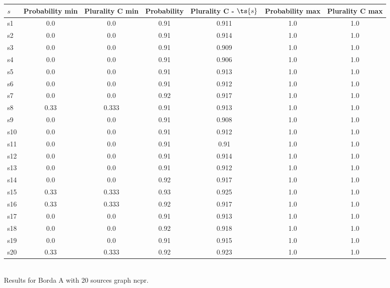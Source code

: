 \documentclass{article}
\begin{document}
\noindent\begin{tabular}{|l|c|c|c|c|c|c|}
\hline
$s$& Probability min & Plurality C min & Probability & Plurality C - $\ts{s}$ & Probability max & Plurality C max\\
\hline
s1 &0.0 & 0.0 & 0.91 & 0.911 & 1.0 & 1.0\\
\hline
s2 &0.0 & 0.0 & 0.91 & 0.914 & 1.0 & 1.0\\
\hline
s3 &0.0 & 0.0 & 0.91 & 0.909 & 1.0 & 1.0\\
\hline
s4 &0.0 & 0.0 & 0.91 & 0.906 & 1.0 & 1.0\\
\hline
s5 &0.0 & 0.0 & 0.91 & 0.913 & 1.0 & 1.0\\
\hline
s6 &0.0 & 0.0 & 0.91 & 0.912 & 1.0 & 1.0\\
\hline
s7 &0.0 & 0.0 & 0.92 & 0.917 & 1.0 & 1.0\\
\hline
s8 &0.33 & 0.333 & 0.91 & 0.913 & 1.0 & 1.0\\
\hline
s9 &0.0 & 0.0 & 0.91 & 0.908 & 1.0 & 1.0\\
\hline
s10 &0.0 & 0.0 & 0.91 & 0.912 & 1.0 & 1.0\\
\hline
s11 &0.0 & 0.0 & 0.91 & 0.91 & 1.0 & 1.0\\
\hline
s12 &0.0 & 0.0 & 0.91 & 0.914 & 1.0 & 1.0\\
\hline
s13 &0.0 & 0.0 & 0.91 & 0.912 & 1.0 & 1.0\\
\hline
s14 &0.0 & 0.0 & 0.92 & 0.917 & 1.0 & 1.0\\
\hline
s15 &0.33 & 0.333 & 0.93 & 0.925 & 1.0 & 1.0\\
\hline
s16 &0.33 & 0.333 & 0.92 & 0.917 & 1.0 & 1.0\\
\hline
s17 &0.0 & 0.0 & 0.91 & 0.913 & 1.0 & 1.0\\
\hline
s18 &0.0 & 0.0 & 0.92 & 0.918 & 1.0 & 1.0\\
\hline
s19 &0.0 & 0.0 & 0.91 & 0.915 & 1.0 & 1.0\\
\hline
s20 &0.33 & 0.333 & 0.92 & 0.923 & 1.0 & 1.0\\
\hline
\end{tabular}\\

\noindent Results for Borda A with 20 sources graph ncpr.
\end{document}
